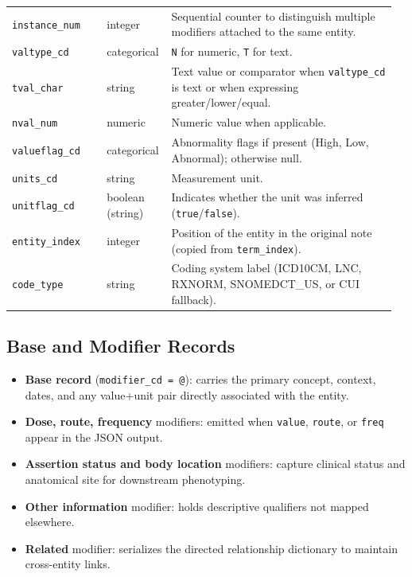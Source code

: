 \begin{longtable}{@{}p{0.24\linewidth}p{0.14\linewidth}p{0.58\linewidth}@{}}
\texttt{instance\_num} & integer & Sequential counter to distinguish multiple modifiers attached to the same entity. \\
\texttt{valtype\_cd} & categorical & \texttt{N} for numeric, \texttt{T} for text. \\
\texttt{tval\_char} & string & Text value or comparator when \texttt{valtype\_cd} is text or when expressing greater/lower/equal. \\
\texttt{nval\_num} & numeric & Numeric value when applicable. \\
\texttt{valueflag\_cd} & categorical & Abnormality flags if present (High, Low, Abnormal); otherwise null. \\
\texttt{units\_cd} & string & Measurement unit. \\
\texttt{unitflag\_cd} & boolean (string) & Indicates whether the unit was inferred (\texttt{true}/\texttt{false}). \\
\texttt{entity\_index} & integer & Position of the entity in the original note (copied from \texttt{term\_index}). \\
\texttt{code\_type} & string & Coding system label (ICD10CM, LNC, RXNORM, SNOMEDCT\_US, or CUI fallback). \\
\bottomrule
\end{longtable}

\subsection{Base and Modifier Records}
\begin{itemize}[leftmargin=1.3em]
\item \textbf{Base record} (\texttt{modifier\_cd = @}): carries the primary concept, context, dates, and any value+unit pair directly associated with the entity.
\item \textbf{Dose, route, frequency} modifiers: emitted when \texttt{value}, \texttt{route}, or \texttt{freq} appear in the JSON output.
\item \textbf{Assertion status and body location} modifiers: capture clinical status and anatomical site for downstream phenotyping.
\item \textbf{Other information} modifier: holds descriptive qualifiers not mapped elsewhere.
\item \textbf{Related} modifier: serializes the directed relationship dictionary to maintain cross-entity links.
\end{itemize}
